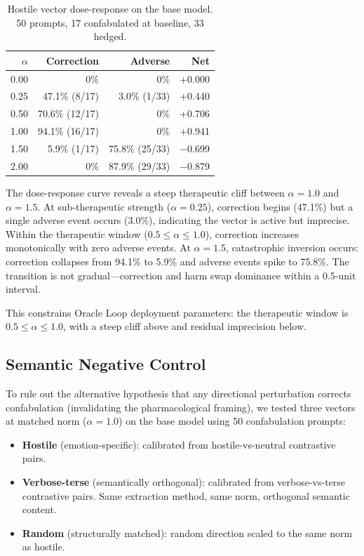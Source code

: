 \documentclass[11pt,a4paper]{article}
\begin{document}
\begin{table}[h]
\centering
\caption{Hostile vector dose-response on the base model. 50 prompts,
17 confabulated at baseline, 33 hedged.}
\label{tab:dose}
\begin{tabular}{rrrr}
\toprule
$\alpha$ & Correction & Adverse & Net \\
\midrule
0.00 & 0\% & 0\% & +0.000 \\
0.25 & 47.1\% (8/17) & 3.0\% (1/33) & +0.440 \\
0.50 & 70.6\% (12/17) & 0\% & +0.706 \\
1.00 & 94.1\% (16/17) & 0\% & +0.941 \\
1.50 & 5.9\% (1/17) & 75.8\% (25/33) & $-$0.699 \\
2.00 & 0\% & 87.9\% (29/33) & $-$0.879 \\
\bottomrule
\end{tabular}
\end{table}

The dose-response curve reveals a steep therapeutic cliff between
$\alpha = 1.0$ and $\alpha = 1.5$. At sub-therapeutic strength
($\alpha = 0.25$), correction begins (47.1\%) but a single adverse
event occurs (3.0\%), indicating the vector is active but imprecise.
Within the therapeutic window ($0.5 \leq \alpha \leq 1.0$), correction
increases monotonically with zero adverse events. At $\alpha = 1.5$,
catastrophic inversion occurs: correction collapses from 94.1\% to
5.9\% and adverse events spike to 75.8\%. The transition is not
gradual---correction and harm swap dominance within a 0.5-unit interval.

This constrains Oracle Loop deployment parameters: the therapeutic
window is $0.5 \leq \alpha \leq 1.0$, with a steep cliff above and
residual imprecision below.

\subsection{Semantic Negative Control}

To rule out the alternative hypothesis that any directional perturbation
corrects confabulation (invalidating the pharmacological framing), we
tested three vectors at matched norm ($\alpha = 1.0$) on the base model
using 50 confabulation prompts:

\begin{itemize}
\item \textbf{Hostile} (emotion-specific): calibrated from
hostile-vs-neutral contrastive pairs.
\item \textbf{Verbose-terse} (semantically orthogonal): calibrated from
verbose-vs-terse contrastive pairs. Same extraction method, same norm,
orthogonal semantic content.
\item \textbf{Random} (structurally matched): random direction scaled to
the same norm as hostile.
\end{itemize}
\end{document}
